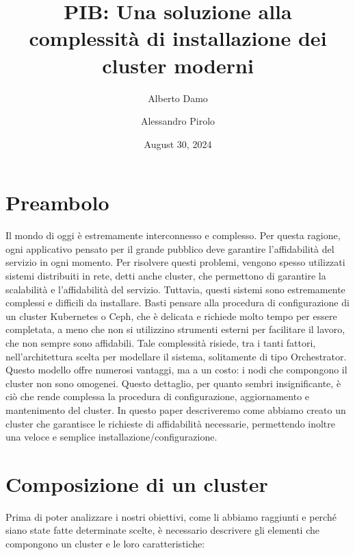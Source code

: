 \documentclass[a4paper]{article}
\title{PIB: Una soluzione alla complessità di installazione dei cluster moderni}
\author{Alberto Damo \and Alessandro Pirolo}
\date{August 30, 2024}
\begin{document}
\maketitle

\newpage
\tableofcontents
\newpage

\section{Preambolo}
Il mondo di oggi è estremamente interconnesso e complesso. Per questa ragione, ogni applicativo pensato per il grande pubblico deve garantire l'affidabilità del servizio in ogni momento. Per risolvere questi problemi, vengono spesso utilizzati sistemi distribuiti in rete, detti anche cluster, che permettono di garantire la scalabilità e l'affidabilità del servizio. Tuttavia, questi sistemi sono estremamente complessi e difficili da installare. Basti pensare alla procedura di configurazione di un cluster Kubernetes o Ceph, che è delicata e richiede molto tempo per essere completata, a meno che non si utilizzino strumenti esterni per facilitare il lavoro, che non sempre sono affidabili. Tale complessità risiede, tra i tanti fattori, nell'architettura scelta per modellare il sistema, solitamente di tipo Orchestrator. Questo modello offre numerosi vantaggi, ma a un costo: i nodi che compongono il cluster non sono omogenei. Questo dettaglio, per quanto sembri insignificante, è ciò che rende complessa la procedura di configurazione, aggiornamento e mantenimento del cluster. In questo paper descriveremo come abbiamo creato un cluster che garantisce le richieste di affidabilità necessarie, permettendo inoltre una veloce e semplice installazione/configurazione.

\newpage
\section{Composizione di un cluster}
Prima di poter analizzare i nostri obiettivi, come li abbiamo raggiunti e perché siano state fatte determinate scelte, è necessario descrivere gli elementi che compongono un cluster e le loro caratteristiche:
\end{document}
